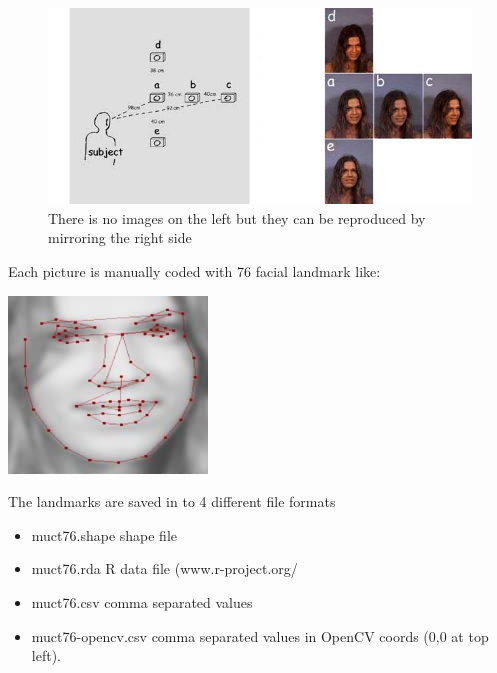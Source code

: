 \documentclass[11pt]{article}
\begin{document}
\begin{figure}[htbp]
\centering
\includegraphics[width=.9\linewidth]{./images/muct-views-lores.jpg}
\caption{There is no images on the left but they can be reproduced by mirroring the right side}
\end{figure}

Each picture is manually coded with 76 facial landmark like:
\begin{center}
\includegraphics[width=.9\linewidth]{./images/landmarks.jpg}
\end{center}


The landmarks are saved in to 4 different file formats

\begin{itemize}
\item muct76.shape       shape file \cite{milborrow2009active}
\item muct76.rda         R data file (www.r-project.org/
\item muct76.csv         comma separated values
\item muct76-opencv.csv  comma separated values in OpenCV coords (0,0 at top left).
\end{itemize}
\end{document}
